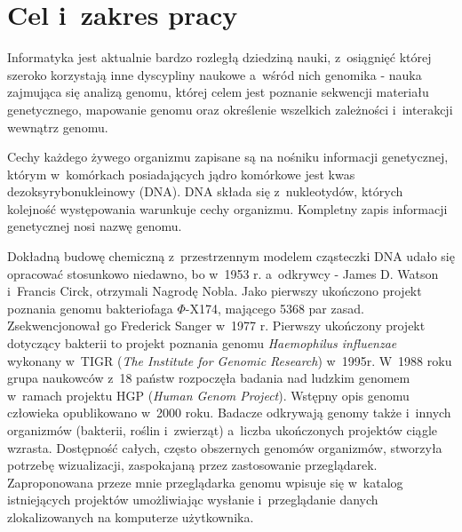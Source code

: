 \documentclass[a4paper,12pt,oneside]{mwrep}  %
\begin{document}
\newpage	
\thispagestyle{empty}
\cleardoublepage 

\tableofcontents

\newpage



\pagestyle{plain}

\chapter{Cel i~zakres pracy}
Informatyka jest aktualnie bardzo rozległą dziedziną nauki, z~osiągnięć której szeroko korzystają inne dyscypliny naukowe a~wśród nich genomika - nauka zajmująca się analizą genomu, której celem jest poznanie sekwencji materiału genetycznego, mapowanie genomu oraz określenie wszelkich zależności i~interakcji wewnątrz genomu.

Cechy każdego żywego organizmu zapisane są na nośniku informacji genetycznej, którym w~komórkach posiadających jądro komórkowe jest kwas dezoksyrybonukleinowy (DNA). DNA składa się z~nukleotydów, których kolejność występowania warunkuje cechy organizmu. Kompletny zapis informacji genetycznej nosi nazwę genomu.

Dokładną budowę chemiczną z~przestrzennym modelem cząsteczki DNA udało się opracować stosunkowo niedawno, bo w~1953 r. a~odkrywcy - James D. Watson i~Francis Circk, otrzymali Nagrodę Nobla. Jako pierwszy ukończono projekt poznania genomu bakteriofaga \begin{math}
\Phi
\end{math}-X174, mającego 5368 par zasad. Zsekwencjonował go Frederick Sanger w~1977 r. Pierwszy ukończony projekt dotyczący bakterii to projekt poznania genomu \emph{Haemophilus influenzae} wykonany w~TIGR (\emph{The Institute for Genomic Research}) w~1995r. W~1988 roku grupa naukowców z~18 państw rozpoczęła badania nad ludzkim genomem w~ramach projektu HGP (\emph{Human Genom Project}). Wstępny opis genomu człowieka opublikowano w~2000 roku. Badacze odkrywają genomy także i~innych organizmów (bakterii, roślin i~zwierząt) a~liczba ukończonych projektów ciągle wzrasta. 
Dostępność całych, często obszernych genomów organizmów, stworzyła potrzebę wizualizacji, zaspokajaną przez zastosowanie przeglądarek.
Zaproponowana przeze mnie przeglądarka genomu wpisuje się w~katalog istniejących projektów umożliwiając wysłanie i~przeglądanie danych zlokalizowanych na komputerze użytkownika. %
\end{document}
